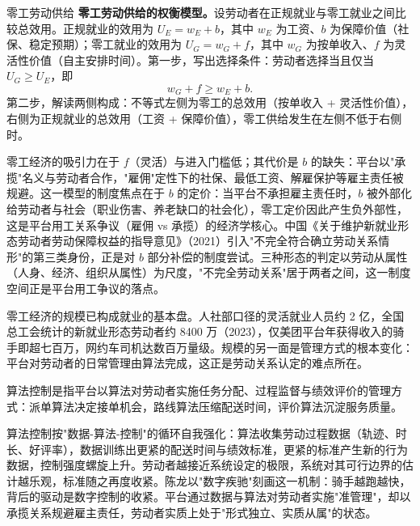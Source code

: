 \begin{derivation}{零工劳动供给}{}
\textbf{零工劳动供给的权衡模型。}设劳动者在正规就业与零工就业之间比较总效用。正规就业的效用为 $U_E = w_E + b$，其中 $w_E$ 为工资、$b$ 为保障价值（社保、稳定预期）；零工就业的效用为 $U_G = w_G + f$，其中 $w_G$ 为按单收入、$f$ 为灵活性价值（自主安排时间）。第一步，写出选择条件：劳动者选择当且仅当 $U_G \geq U_E$，即
\[
w_G + f \geq w_E + b.
\]
第二步，解读两侧构成：不等式左侧为零工的总效用（按单收入 + 灵活性价值），右侧为正规就业的总效用（工资 + 保障价值），零工供给发生在左侧不低于右侧时。
\end{derivation}

零工经济的吸引力在于 $f$（灵活）与进入门槛低；其代价是 $b$ 的缺失：平台以"承揽"名义与劳动者合作，"雇佣"定性下的社保、最低工资、解雇保护等雇主责任被规避。这一模型的制度焦点在于 $b$ 的定价：当平台不承担雇主责任时，$b$ 被外部化给劳动者与社会（职业伤害、养老缺口的社会化），零工定价因此产生负外部性，这是平台用工关系争议（雇佣 vs 承揽）的经济学核心。中国《关于维护新就业形态劳动者劳动保障权益的指导意见》（2021）引入"不完全符合确立劳动关系情形"的第三类身份，正是对 $b$ 部分补偿的制度尝试。三种形态的判定以劳动从属性（人身、经济、组织从属性）为尺度，"不完全劳动关系"居于两者之间，这一制度空间正是平台用工争议的落点。

零工经济的规模已构成就业的基本盘。人社部口径的灵活就业人员约 2 亿，全国总工会统计的新就业形态劳动者约 8400 万（2023），仅美团平台年获得收入的骑手即超七百万，网约车司机达数百万量级。规模的另一面是管理方式的根本变化：平台对劳动者的日常管理由算法完成，这正是劳动关系认定的难点所在。

\begin{definition}
算法控制是指平台以算法对劳动者实施任务分配、过程监督与绩效评价的管理方式：派单算法决定接单机会，路线算法压缩配送时间，评价算法沉淀服务质量。
\end{definition}

算法控制按"数据-算法-控制"的循环自我强化：算法收集劳动过程数据（轨迹、时长、好评率），数据训练出更紧的配送时间与绩效标准，更紧的标准产生新的行为数据，控制强度螺旋上升。劳动者越接近系统设定的极限，系统对其可行边界的估计越乐观，标准随之再度收紧。陈龙以"数字疾驰"刻画这一机制：骑手越跑越快，背后的驱动是数字控制的收紧。平台通过数据与算法对劳动者实施"准管理"，却以承揽关系规避雇主责任，劳动者实质上处于"形式独立、实质从属"的状态。

